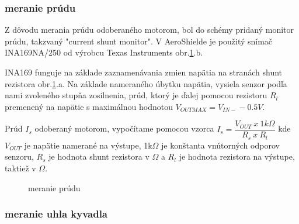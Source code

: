 \subsubsection{meranie prúdu}
\label{merprud}

Z dôvodu merania prúdu odoberaného motorom, bol do schémy pridaný monitor prúdu, takzvaný "current shunt monitor". V AeroShielde je použitý snímač INA169NA/250 od výrobcu Texas Instruments obr.\ref{OBRAZOK 2.3}.b.

INA169 funguje na základe zaznamenávania zmien napätia na stranách shunt rezistora obr.\ref{OBRAZOK 2.3}.a. Na základe nameraného úbytku napätia, vysiela senzor podľa nami zvoleného stupňa zosilnenia, prúd, ktorý je ďalej pomocou rezistoru $R_{l}$ premenený na napätie s maximálnou hodnotou $V_{OUTMAX} = V_{IN-} - 0.5V $.

Prúd $I_{s}$ odoberaný motorom, vypočítame pomocou vzorca $I_{s} = \dfrac{V_{OUT}\: x \: 1k\Omega}{R_{s} \: x \: R_{l}} $ kde $V_{OUT}$ je napätie namerané na výstupe, 1k$\Omega$ je konštanta vnútorných odporov senzoru, $R_{s}$ je hodnota shunt rezistora v $\Omega$ a $R_{l}$ je hodnota rezistora na výstupe, taktiež v $\Omega$\cite{INA}.

\begin{figure}[!tbh]
	\hfill
	\hfill
	\hfill
	\caption{meranie prúdu}\label{OBRAZOK 2.3}
\end{figure}


\label{Hall}
\pagebreak

\subsubsection{meranie uhla kyvadla}
\label{meruhl}

